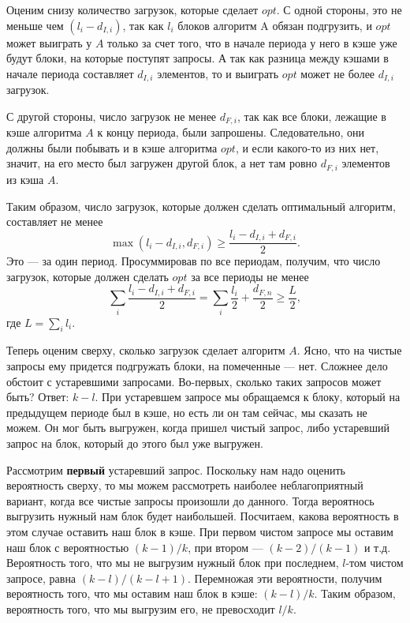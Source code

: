 \documentclass[a4paper]{article}
\theoremstyle{indented}
\theoremstyle{definition}
\theoremstyle{remark}
\begin{document}
Оценим снизу количество загрузок, которые сделает $opt$. 
С одной стороны, это не меньше чем $(l_i-d_{I,i})$, 
так как $l_i$ блоков алгоритм A обязан подгрузить, 
и $opt$ может выиграть у $A$ только за счет того, 
что в начале периода у него в кэше уже будут блоки, 
на которые поступят запросы. 
А так как разница между кэшами в начале периода составляет $d_{I,i}$ 
элементов, то и выиграть $opt$ может не более $d_{I,i}$ загрузок. 

С другой стороны, число загрузок не менее $d_{F,i}$, 
так как все блоки, лежащие в кэше алгоритма $A$ к концу периода, 
были запрошены. Следовательно, они должны были побывать и в кэше 
алгоритма $opt$, и если какого-то из них нет, значит, на его место 
был загружен другой блок, а нет там ровно $d_{F,i}$ элементов из кэша $A$. 

Таким образом, число загрузок, которые должен сделать оптимальный алгоритм,
составляет не менее 
$$\max(l_i-d_{I,i}, d_{F,i}) \ge \frac{l_i-d_{I,i}+d_{F,i}}{2}.$$
Это --- за один период. Просуммировав по все периодам, получим, 
что число загрузок, которые должен сделать $opt$ за все периоды не менее 
$$\sum_i\frac{l_i - d_{I,i} + d_{F,i}}2 = 
\sum_i \frac{l_i}2 + \frac{d_{F,n}}2 \ge \frac{L}2,$$ где $L = \sum_i l_i$.

Теперь оценим сверху, сколько загрузок сделает алгоритм $A$. 
Ясно, что на чистые запросы ему придется подгружать блоки, 
на помеченные --- нет. Сложнее дело обстоит с устаревшими запросами. 
Во-первых, сколько таких запросов может быть? 
Ответ: $k-l$. При устаревшем запросе мы обращаемся к блоку, 
который на предыдущем периоде был в кэше, но есть ли он там сейчас, 
мы сказать не можем. Он мог быть выгружен, когда пришел чистый запрос,
либо устаревший запрос на блок, который до этого был уже выгружен. 

Рассмотрим {\bfseries первый} устаревший запрос. 
Поскольку нам надо оценить вероятность сверху, 
то мы можем рассмотреть наиболее неблагоприятный вариант, 
когда все чистые запросы произошли до данного. 
Тогда вероятнось выгрузить нужный нам блок будет наибольшей. 
Посчитаем, какова вероятность в этом случае оставить наш блок в кэше. 
При первом чистом запросе мы оставим наш блок с вероятностью $(k-1)/k$, 
при втором --- $(k-2)/(k-1)$ и т.д. 
Вероятность того, что мы не выгрузим нужный блок при последнем, 
$l$-том чистом запросе, равна $(k-l)/(k-l+1)$. 
Перемножая эти вероятности, получим вероятность того, 
что мы оставим наш блок в кэше: $(k-l)/k$. 
Таким образом, вероятность того, что мы выгрузим его, не превосходит $l/k$.
\end{document}
